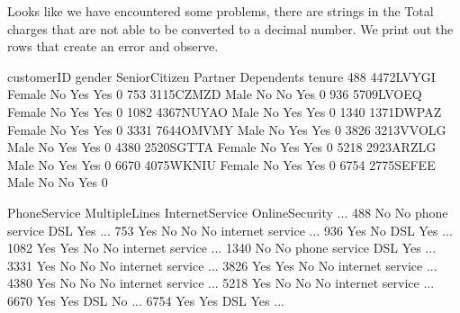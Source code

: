 \documentclass[letterpaper,10pt,english]{jupyterBook}
\begin{document}
\sphinxAtStartPar
Looks like we have encountered some problems, there are strings in the Total charges that are not able to be converted to a decimal number.
We print out the rows that create an error and observe.

\begin{sphinxVerbatim}[commandchars=\\\{\}]
\PYG{p}{[}\PYG{p}{]}
\end{sphinxVerbatim}

\begin{sphinxVerbatim}[commandchars=\\\{\}]
      customerID  gender SeniorCitizen Partner Dependents  tenure  \PYGZbs{}
488   4472\PYGZhy{}LVYGI  Female            No     Yes        Yes       0   
753   3115\PYGZhy{}CZMZD    Male            No      No        Yes       0   
936   5709\PYGZhy{}LVOEQ  Female            No     Yes        Yes       0   
1082  4367\PYGZhy{}NUYAO    Male            No     Yes        Yes       0   
1340  1371\PYGZhy{}DWPAZ  Female            No     Yes        Yes       0   
3331  7644\PYGZhy{}OMVMY    Male            No     Yes        Yes       0   
3826  3213\PYGZhy{}VVOLG    Male            No     Yes        Yes       0   
4380  2520\PYGZhy{}SGTTA  Female            No     Yes        Yes       0   
5218  2923\PYGZhy{}ARZLG    Male            No     Yes        Yes       0   
6670  4075\PYGZhy{}WKNIU  Female            No     Yes        Yes       0   
6754  2775\PYGZhy{}SEFEE    Male            No      No        Yes       0   

     PhoneService     MultipleLines InternetService       OnlineSecurity  ...  \PYGZbs{}
488            No  No phone service             DSL                  Yes  ...   
753           Yes                No              No  No internet service  ...   
936           Yes                No             DSL                  Yes  ...   
1082          Yes               Yes              No  No internet service  ...   
1340           No  No phone service             DSL                  Yes  ...   
3331          Yes                No              No  No internet service  ...   
3826          Yes               Yes              No  No internet service  ...   
4380          Yes                No              No  No internet service  ...   
5218          Yes                No              No  No internet service  ...   
6670          Yes               Yes             DSL                   No  ...   
6754          Yes               Yes             DSL                  Yes  ...   


\end{sphinxVerbatim}
\end{document}
